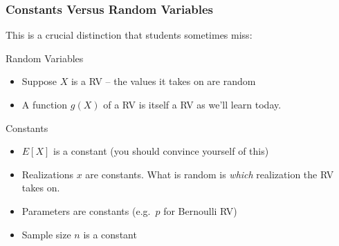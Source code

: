 \begin{frame}
\frametitle{Constants Versus Random Variables}

 \alert{This is a crucial distinction that students sometimes miss:}
 \vspace{1em}
 

 		\begin{block}{Random Variables}
 			\begin{itemize}
 			\item Suppose $X$ is a RV -- the values it takes on are random
 			\item A function $g(X)$ of a RV is itself a RV as we'll learn today.
 			\end{itemize}
 		\end{block}
 
 		\begin{block}{Constants}
 			\begin{itemize}
 				\item $E[X]$ is a constant (you should convince yourself of this)
 				\item Realizations $x$ are constants. What is random is \emph{which} realization the RV takes on.
 				\item Parameters are constants (e.g.\ $p$ for Bernoulli RV)
 				\item Sample size $n$ is a constant
 			\end{itemize}
 		\end{block} 

\end{frame}
